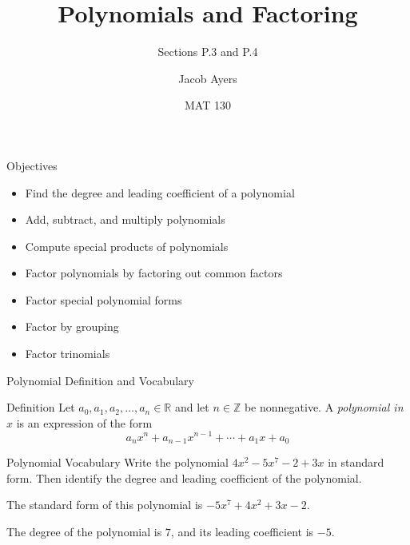 \documentclass{beamer}
\title[P.3 and P.4]{Polynomials and Factoring}
\subtitle{Sections P.3 and P.4}
\author{Jacob Ayers}
\institute{Lesson \# 2}
\date{MAT 130}
\def\R{\mathbb{R}} %
\def\Z{\mathbb{Z}} %
\begin{document}
\begin{frame}
\titlepage
\end{frame}

\begin{frame}[t]{Objectives}
\begin{itemize}
	\item Find the degree and leading coefficient of a polynomial
	\item Add, subtract, and multiply polynomials
	\item Compute special products of polynomials
	\item Factor polynomials by factoring out common factors
	\item Factor special polynomial forms
	\item Factor by grouping
	\item Factor trinomials
\end{itemize}
\end{frame}

\begin{frame}[t]{Polynomial Definition and Vocabulary}
\begin{block}{Definition}
Let $a_0, a_1, a_2, \dots, a_n \in \R$ and let $n \in \Z$ be nonnegative. A \textit{polynomial in $x$} is an expression of the form $$a_nx^n + a_{n-1}x^{n-1} + \cdots + a_1x + a_0$$
\end{block}




\end{frame}

\begin{frame}[t]{Polynomial Vocabulary}
Write the polynomial $4x^2 - 5x^7 - 2 + 3x$ in standard form. Then identify the degree and leading coefficient of the polynomial.

\pause

The standard form of this polynomial is $-5x^7 + 4x^2 + 3x - 2$.

\pause

The degree of the polynomial is $7$, and its leading coefficient is $-5$.
\end{frame}
\end{document}
